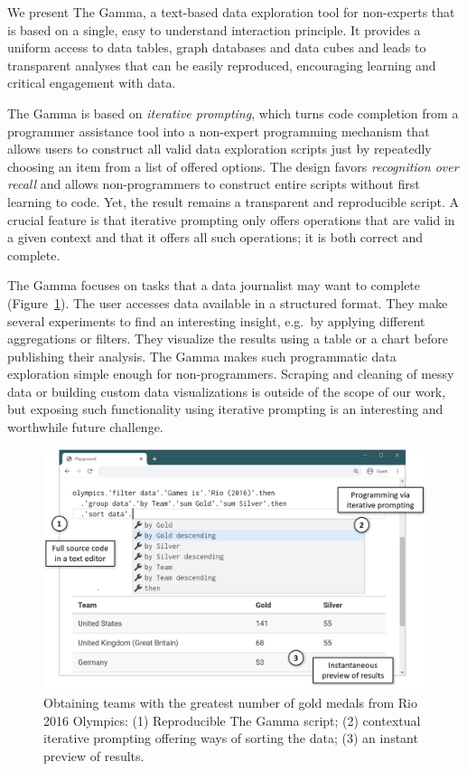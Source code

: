 \documentclass[conference]{IEEEtran}
\begin{document}
We present The Gamma, a text-based data exploration tool for non-experts that is based on a single,
easy to understand interaction principle. It provides a uniform access to data tables, graph
databases and data cubes and leads to transparent analyses that can be easily reproduced,
encouraging learning and critical engagement with data.

The Gamma is based on \emph{iterative prompting}, which turns code completion from a programmer
assistance tool into a non-expert programming mechanism that allows users to construct all valid
data exploration scripts just by repeatedly choosing an item from a list of offered options.
The design favors \emph{recognition over recall} and allows non-programmers to construct entire
scripts without first learning to code. Yet, the result remains a transparent and reproducible script.
A crucial feature is that iterative prompting only offers operations that are valid in a given
context and that it offers all such operations; it is both correct and complete.

The Gamma focuses on tasks that a data journalist may want to complete (Figure~\ref{fig:thegamma}).
The user accesses data available in a structured format. They make several experiments to find an
interesting insight, e.g.~by applying different aggregations or filters. They
visualize the results using a table or a chart before publishing their analysis. The
Gamma makes such programmatic data exploration simple enough for non-programmers. Scraping and
cleaning of messy data or building custom data visualizations is outside of the scope of
our work, but exposing such functionality using iterative prompting is an interesting and
worthwhile future challenge.

\begin{figure}
\includegraphics[width=1\columnwidth]{figures/thegamma-annot}
\caption{Obtaining teams with the greatest number of gold medals from Rio 2016
Olympics: (1) Reproducible The Gamma script; (2) contextual iterative prompting
offering ways of sorting the data; (3) an instant preview of results.}
\label{fig:thegamma}
\vspace{-1em}
\end{figure}
\end{document}
